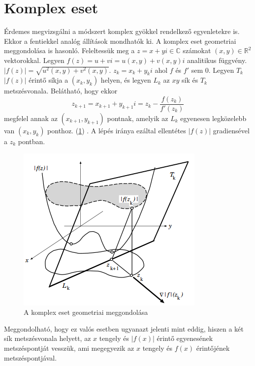 \documentclass[a4paper,12pt]{report}
\begin{document}


		\section{Komplex eset}
			Érdemes megvizsgálni a módszert komplex gyökkel rendelkező egyenletekre is. Ekkor a fentiekkel analóg állítások mondhatók ki. A komplex eset geometriai meggondolása is hasonló. Feleltessük meg a $z=x+yi \in \mathbb{C}$ számokat $(x,y)\in\mathbb{R}^2$ vektorokkal. Legyen $f(z)=u+vi=u(x,y)+v(x,y)i$ analitikus függvény. $|f(z)|=\sqrt{u^2(x,y)+v^2(x,y)}$. $z_k=x_k+y_ki$ ahol $f$ és $f'$ sem 0. Legyen $T_k$ $|f(z)|$ érintő síkja a $(x_k,y_k)$ helyen, és legyen $L_k$ az $xy$ sík és $T_k$ metszésvonala. Belátható, hogy ekkor \[z_{k+1}=x_{k+1}+y_{k+1}i=z_k-\frac{f(z_k)}{f'(z_k)}\] megfelel annak az $(x_{k+1},y_{k+1})$ pontnak, amelyik az $L_k$ egyenesen legközelebb van $(x_k,y_k)$ ponthoz. (\ref{k6}) \cite[p. 809]{Yau98}. A lépés iránya ezáltal ellentétes $|f(z)|$ gradiensével a $z_k$ pontban.
			
			 \begin{figure}[ht]
				\begin{center}
				\includegraphics[scale=0.7]{kep6.png}
				\caption{A komplex eset geometriai meggondolása \cite[p. 807]{Yau98}} \label{k6}
				\end{center}
			\end{figure}
			
			Meggondolható, hogy ez valós esetben ugyanazt jelenti mint eddig, hiszen a két sík metszésvonala helyett, az $x$ tengely és $|f(x)|$ érintő egyenesének metszéspontját vesszük, ami megegyezik az $x$ tengely és $f(x)$ érintőjének metszéspontjával.
\end{document}
